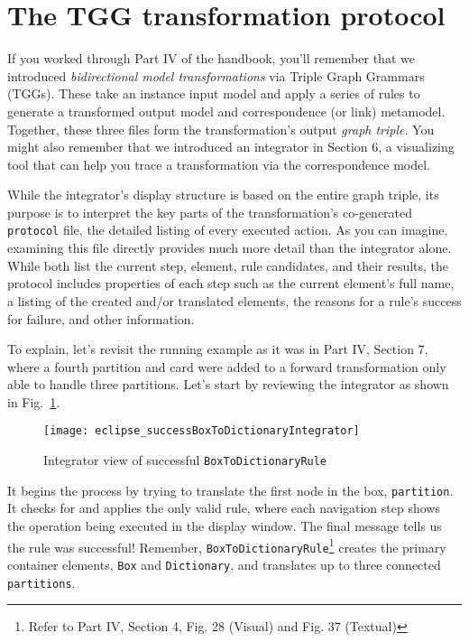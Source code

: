 \newpage

\section{The TGG transformation protocol}

\genHeader

If you worked through Part IV of the handbook, you'll remember that we introduced \emph{bidirectional model transformations} via Triple Graph Grammars
(TGGs). These take an instance input model and apply a series of rules to generate a transformed output model and correspondence (or link) metamodel.
Together, these three files form the transformation's output \emph{graph triple}. You might also remember that we introduced an integrator in
Section 6, a visualizing tool that can help you trace a transformation via the correspondence model. 

While the integrator's display structure is based on the entire graph triple, its purpose is to interpret the key parts of the transformation's co-generated
\texttt{protocol} file, the detailed listing of every executed action. As you can imagine, examining this file directly provides much more detail than the
integrator alone. While both list the current step, element, rule candidates, and their results, the protocol includes properties of each step such as the
current element's full name, a listing of the created and/or translated elements, the reasons for a rule's success for failure, and other information.

To explain, let's revisit the running example as it was in Part IV, Section 7, where a fourth partition and card were added to a forward
transformation only able to handle three partitions. Let's start by reviewing the integrator as shown in Fig.~\ref{eclipse:integratorFWD}.

\begin{figure}[htbp]
\begin{center} 
  \texttt{[image: eclipse\_successBoxToDictionaryIntegrator]}
  \caption{Integrator view of successful \texttt{BoxToDictionaryRule}}  
  \label{eclipse:integratorFWD}
\end{center}
\end{figure}

It begins the process by trying to translate the first node in the box, \texttt{part\-it\-ion}. It checks for and applies the only valid rule, where each
navigation step shows the operation being executed in the display window. The final message tells us the rule was successful! Remember,
\texttt{BoxToDictionaryRule}\footnote{Refer to Part IV, Section 4, Fig. 28 (Visual) and Fig. 37 (Textual)} creates the primary container elements, \texttt{Box}
and \texttt{Dictionary}, and translates up to three connected \texttt{partitions}.

